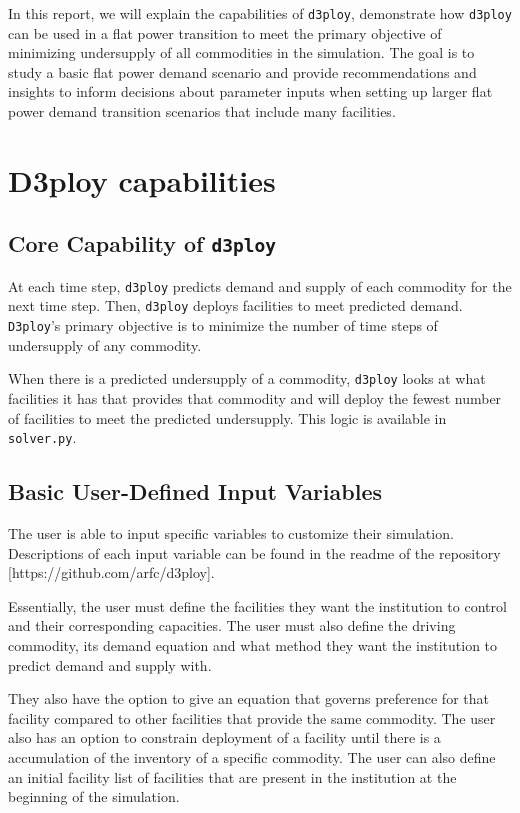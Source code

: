 \documentclass[11pt,letterpaper]{article}
\newcommand{\deploy}{\texttt{d3ploy}\xspace}%
\newcommand{\Deploy}{\texttt{D3ploy}\xspace}%
\begin{document}
In this report, we will explain the capabilities of \deploy, 
demonstrate how \deploy can be used in a flat power transition 
to meet the primary objective of minimizing undersupply of all 
commodities in the simulation. 
The goal is to study a basic flat power demand scenario 
and provide recommendations and insights to inform 
decisions about parameter inputs when setting up 
larger flat power demand transition scenarios that include many 
facilities. 

\section{D3ploy capabilities}
\subsection{Core Capability of \deploy}
At each time step, \deploy predicts demand and supply of each 
commodity for the next time step.
Then, \deploy deploys facilities to meet predicted demand. 
\Deploy's primary objective is to minimize the number of time 
steps of undersupply of any commodity. 

When there is a predicted undersupply of a commodity, \deploy looks 
at what facilities it has that provides that commodity and 
will deploy the fewest number of facilities
to meet the predicted undersupply. 
This logic is available in \texttt{solver.py}. 

\subsection{Basic User-Defined Input Variables}
The user is able to input specific variables to customize their
simulation. 
Descriptions of each input variable can be found in the 
readme of the repository [https://github.com/arfc/d3ploy]. 

Essentially, the user must define the facilities they want the 
institution to control and their corresponding capacities. 
The user must also define the driving commodity, its demand 
equation and what method they want the institution to predict 
demand and supply with. 

They also have the option to give an equation that governs
preference for that facility compared to other facilities that 
provide the same commodity. 
The user also has an option to constrain deployment of a facility 
until there is a accumulation of the inventory of a specific commodity.  
The user can also define an initial facility list of facilities that 
are present in the institution at the beginning of the simulation. 
\end{document}
